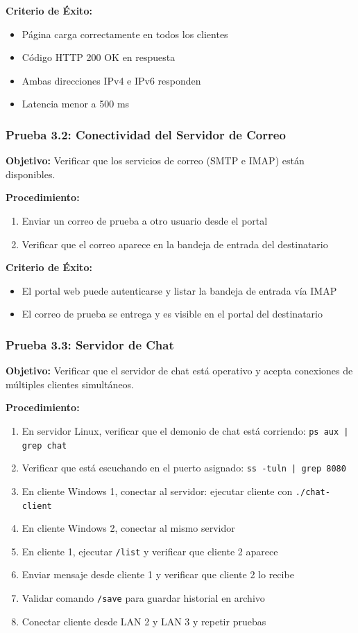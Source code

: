 \textbf{Criterio de Éxito:}
\begin{itemize}
\item Página carga correctamente en todos los clientes
\item Código HTTP 200 OK en respuesta
\item Ambas direcciones IPv4 e IPv6 responden
\item Latencia menor a 500 ms
\end{itemize}


\subsubsection{Prueba 3.2: Conectividad del Servidor de Correo}

\textbf{Objetivo:} Verificar que los servicios de correo (SMTP e IMAP) están disponibles.

\textbf{Procedimiento:}
\begin{enumerate}
\item Enviar un correo de prueba a otro usuario desde el portal
\item Verificar que el correo aparece en la bandeja de entrada del destinatario
\end{enumerate}

\textbf{Criterio de Éxito:}
\begin{itemize}
\item El portal web puede autenticarse y listar la bandeja de entrada vía IMAP
\item El correo de prueba se entrega y es visible en el portal del destinatario
\end{itemize}


\subsubsection{Prueba 3.3: Servidor de Chat}

\textbf{Objetivo:} Verificar que el servidor de chat está operativo y acepta
conexiones de múltiples clientes simultáneos.

\textbf{Procedimiento:}
\begin{enumerate}
\item En servidor Linux, verificar que el demonio de chat está corriendo:
  \texttt{ps aux | grep chat}
\item Verificar que está escuchando en el puerto asignado:
  \texttt{ss -tuln | grep 8080}
\item En cliente Windows 1, conectar al servidor: ejecutar cliente con
  \texttt{./chat-client \ipServidorChat\xspace 8080}
\item En cliente Windows 2, conectar al mismo servidor
\item En cliente 1, ejecutar \texttt{/list} y verificar que cliente 2 aparece
\item Enviar mensaje desde cliente 1 y verificar que cliente 2 lo recibe
\item Validar comando \texttt{/save} para guardar historial en archivo
\item Conectar cliente desde LAN 2 y LAN 3 y repetir pruebas
\end{enumerate}

